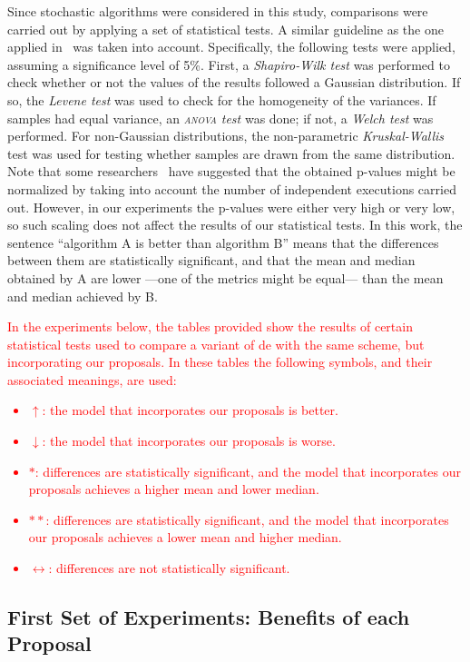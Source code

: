 \documentclass[preprint,3p]{elsarticle}
\newcommand{\DE}{{\sc de}}
\begin{document}
Since stochastic algorithms were considered in this study, comparisons were carried out by applying a set of statistical tests.
%
A similar guideline as the one applied in~\cite{Durillo:10} was taken into account.
%
Specifically, the following tests were applied, assuming a significance level of 5\%.
%
First, a \emph{Shapiro-Wilk test} was performed to check whether or not
the values of the results followed a Gaussian distribution.
%
If so, the \emph{Levene test} was used to check for the homogeneity of the variances.
%
If samples had equal variance, an \emph{\textsc{anova} test} was done; if not, a \emph{Welch test} was performed.
%
For non-Gaussian distributions, the non-parametric \emph{Kruskal-Wallis} test was
used for testing whether samples are drawn from the same distribution.
%
Note that some researchers~\cite{Good:92} have suggested that the obtained p-values might be normalized 
by taking into account the number of independent executions carried out.
%
However, in our experiments the p-values were either very high or very low, so such scaling does not
affect the results of our statistical tests.
%
In this work, the sentence ``algorithm A is better than algorithm B'' means that the
differences between them are statistically significant, and that the mean and median obtained
by A are lower ---one of the metrics might be equal--- than the mean and median achieved by B.
%
\textcolor{red}{
In the experiments below, the tables provided show the results of certain statistical tests used to
compare a variant of \DE{} with the same scheme, but incorporating our proposals.
%
In these tables the following symbols, and their associated meanings, are used:
%
\begin{itemize}
	\item $\uparrow$: the model that incorporates our proposals is better.
	\item $\downarrow$: the model that incorporates our proposals is worse.
	\item $*$: differences are statistically significant, and the model that incorporates our proposals achieves a higher mean and lower median.
	\item $**$: differences are statistically significant, and the model that incorporates our proposals  achieves a lower mean and higher median.
	\item $\leftrightarrow$: differences are not statistically significant.
\end{itemize}
%
}

\subsection{First Set of Experiments: Benefits of each Proposal}
\end{document}

